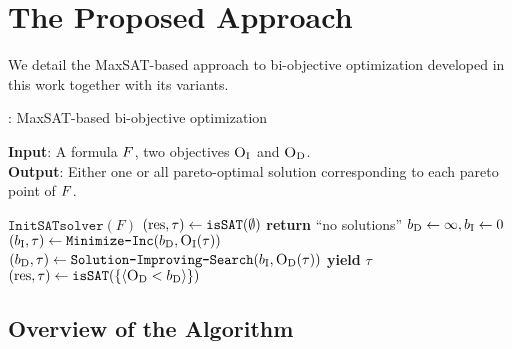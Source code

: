 \chapter{The Proposed Approach\label{chap:approach}}

We detail the MaxSAT-based approach to bi-objective optimization developed in this work together with its variants.

\begin{algorithm}[t]
  \caption{\algname{}: MaxSAT-based  bi-objective optimization} %
  \label{alg:base-algorithm}
  \textbf{Input}: A formula $F$, two objectives $\textsc{O}_{\text{I}}$ and $\textsc{O}_{\text{D}}$.\\
  \textbf{Output}: Either one or all pareto-optimal solution corresponding to each pareto point of $F$.

  \begin{algorithmic}[1]
    \STATE $\texttt{InitSATsolver}(F)$ \label{l:init-solv} 
    \STATE $(\text{res}, \tau) \gets \texttt{isSAT}(\emptyset)$ \quad{}  \label{l:sols} 
      \STATE \textbf{return} ``no solutions''
    \ENDIF
    \STATE $b_{\text{D}} \gets \infty, b_{\text{I}} \gets 0$ \label{l:bounds}
     \label{l:loopstart}
    \STATE $(b_{\text{I}}, \tau) \gets \texttt{Minimize-\allowbreak{}Inc}(b_{\text{D}} , \textsc{O}_{\text{I}}(\tau))$  \quad{}\label{l:minim1}
    \STATE $(b_{\text{D}}, \tau) \gets  \texttt{Solution-\allowbreak{}Improving-\allowbreak{}Search}(b_{\text{I}} , \textsc{O}_{\text{D}}(\tau))$  \quad{}\label{l:minim2}
    \STATE \textbf{yield} $\tau$  \quad{} \label{ln:stage3} 
    \STATE $(\text{res}, \tau) \gets \texttt{isSAT}(\{\langle \textsc{O}_{\text{D}} < b_{\text{D}} \rangle\})$\label{l:endL}
    \ENDWHILE
  \end{algorithmic}
\end{algorithm}

\section{Overview of the Algorithm\label{sec:algorithm}}

